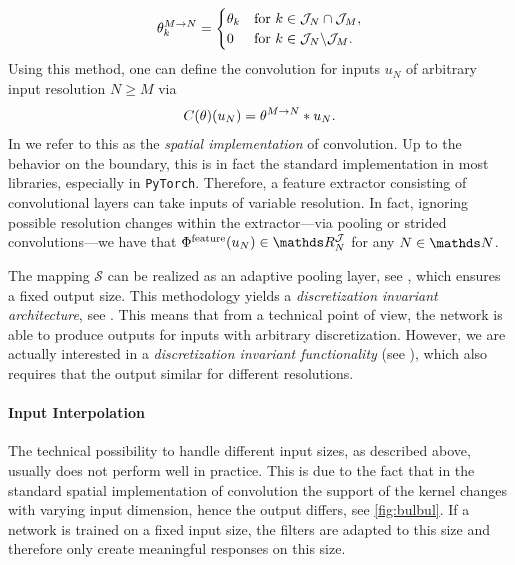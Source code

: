 %
\begin{align*}
\theta^{M \rightarrow N}_k = 
\begin{cases}
\theta_k & \text{for } k \in \mathcal{J}_N \cap \mathcal{J}_M,\\
0 & \text{for } k \in \mathcal{J}_N \backslash \mathcal{J}_M.
\end{cases}
\end{align*}
%
Using this method, one can define the convolution for inputs $u_N$ of arbitrary input resolution $N\geq M$ via
%
\begin{align*}
C(\theta)(u_N)= \theta^{M \rightarrow N} \ast u_N.
\end{align*}
%
In \cite{kabri2023resolution} we refer to this as the \emph{spatial implementation} of convolution. Up to the behavior on the boundary, this is in fact the standard implementation in most libraries, especially in \texttt{PyTorch}. Therefore, a feature extractor consisting of convolutional layers can take inputs of variable resolution. In fact, ignoring possible resolution changes within the extractor---via pooling or strided convolutions---we have that $\Phi^{\text{feature}}(\img_N)\in \R^{\mathcal{J}}_N$ for any $N\in\N$.

The mapping $\mathcal{S}$ can be realized as an adaptive pooling layer, see \cite{paszke2019pytorch}, which ensures a fixed output size. This methodology yields a \emph{discretization invariant architecture}, see \cite{kabri2022FNO, kovachki2021universal, li2020fourier}. This means that from a technical point of view, the network is able to produce outputs for inputs with arbitrary discretization. However, we are actually interested in a \emph{discretization invariant functionality} (see \cite{kabri2022FNO, kovachki2021universal, li2020fourier}), which also requires that the output similar for different resolutions.
%
\paragraph{Input Interpolation}
%
%
The technical possibility to handle different input sizes, as described above, usually does not perform well in practice. This is due to the fact that in the standard spatial implementation of convolution the support of the kernel changes with varying input dimension, hence the output differs, see \cref{fig:bulbul}. If a network is trained on a fixed input size, the filters are adapted to this size and therefore only create meaningful responses on this size.

